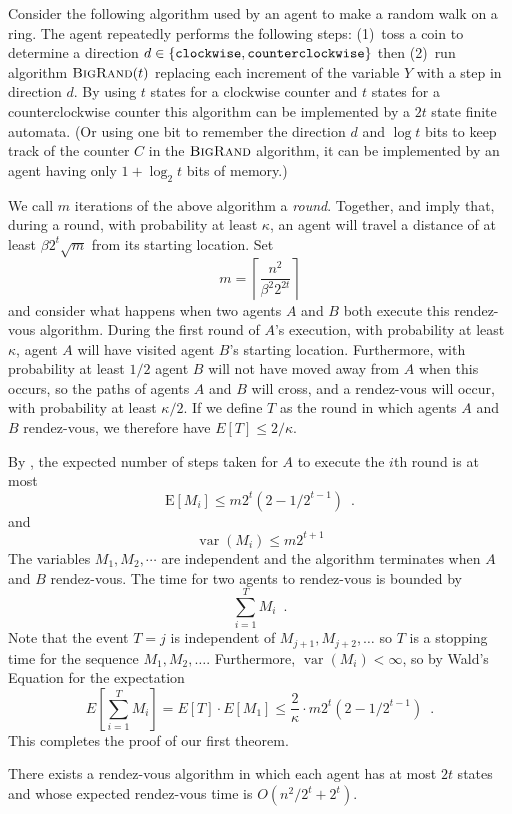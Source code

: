 \documentclass[lotsofwhite]{patmorin}
\newcommand{\bigrand}{\textsc{BigRand}}
\newcommand{\E}{\mathrm{E}}
\DeclareMathOperator{\var}{var}
\begin{document}
Consider the following algorithm used by an agent to make a random
walk on a ring.  The agent repeatedly performs the following steps:
(1)~toss a coin to determine a direction
$d\in\{\mbox{{\tt clockwise}},\mbox{{\tt counterclockwise}}\}$ then (2)~run
algorithm $\bigrand(t)$ replacing each increment of the variable
$Y$ with a step in direction $d$.  By using  $t$ states for 
a clockwise counter and $t$ states for a counterclockwise counter this algorithm
can be implemented by a $2t$ state finite automata. (Or using 
one bit to remember the
direction $d$ and $\log t$ bits to keep track of the counter $C$ in the
$\bigrand$ algorithm, it can be implemented by an agent
having only $1+\log_2 t$ bits of memory.) 

We call $m$ iterations of the above algorithm a \emph{round}.
Together,  and  imply that, during a
round, with probability at least $\kappa$, an agent will travel a
distance of at least $\beta 2^t \sqrt{m}$ from its starting
location.  Set
\[
   m= \left\lceil \frac{n^2}{\beta^2 2^{2t}} \right\rceil 
\]
and consider what happens when two agents $A$ and $B$ both execute
this rendez-vous algorithm.  During the first round of $A$'s
execution, with probability at least $\kappa$, agent $A$ will have
visited agent $B$'s starting location. Furthermore, with probability
at least $1/2$ agent $B$ will not have moved away from $A$ when this
occurs, so the paths of agents $A$ and $B$ will cross, and a
rendez-vous will occur, with probability at least $\kappa/2$.  If we
define $T$ as the round in which agents $A$ and $B$ rendez-vous, we
therefore have $E[T]\le 2/\kappa$.

By , the expected number of steps taken for $A$ to
execute the $i$th round is at most
\[
    \E[M_i] \le m 2^{t}(2-1/2^{t-1}) \enspace . 
\]
and
\[
    \var(M_i) \le m 2^{t+1} 
\]
The variables $M_1,M_2,\cdots$ are independent and the algorithm
terminates when $A$ and $B$ rendez-vous.  The time for two agents to
rendez-vous is bounded by 
\[
   \sum_{i=1}^T M_i \enspace .
\]
Note that the event $T=j$ is independent of $M_{j+1},M_{j+2},\ldots$
so $T$ is a stopping time for the sequence
$M_1,M_2,\ldots$.  Furthermore, $\var(M_i)<\infty$, so by Wald's
Equation for the expectation
\[
   E\left[\sum_{i=1}^T M_i\right] = E[T]\cdot E[M_1] 
     \le \frac{2}{\kappa}\cdot m 2^{t}(2-1/2^{t-1}) \enspace .
\]
This completes the proof of our first theorem.
\begin{thm}
There exists a rendez-vous algorithm in which each agent has at most
$2t$ states and whose expected rendez-vous time is
$O(n^2/2^{t} + 2^{t})$.
\end{thm}
\end{document}
